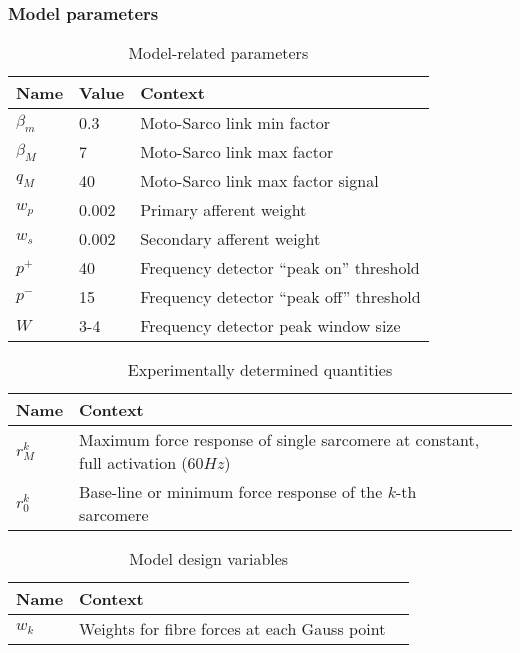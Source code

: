 \subsubsection{Model parameters}
\begin{table}[!ht]
	\begin{tabular}{l|l|l}
		Name & Value & Context\\\hline
		$\beta_m$ & 0.3 & Moto-Sarco link min factor\\
		$\beta_M$ & 7 & Moto-Sarco link max factor\\
		$q_M$ & 40 & Moto-Sarco link max factor signal\\
		$w_p$ & 0.002 & Primary afferent weight\\
		$w_s$ & 0.002 & Secondary afferent weight\\
		$p^+$ & 40 & Frequency detector ``peak on'' threshold\\
		$p^-$ & 15 & Frequency detector ``peak off'' threshold\\
		$W$ & 3-4 & Frequency detector peak window size
	\end{tabular}
	\caption{Model-related parameters}\label{tab:params}
\end{table}
\begin{table}[!ht]
	\begin{tabular}{l|ll}
		Name & Context\\\hline
		$r^k_M$ & Maximum force response of single sarcomere at constant, full activation ($60Hz$)\\
		$r^k_0$ & Base-line or minimum force response of the $k$-th sarcomere 
	\end{tabular}
	\caption{Experimentally determined quantities}\label{tab:params}
\end{table}
\begin{table}[!ht]
	\begin{tabular}{l|ll}
		Name &  Context\\\hline
		$w_k$ & Weights for fibre forces at each Gauss point  
	\end{tabular}
	\caption{Model design variables}\label{tab:params}
\end{table}

